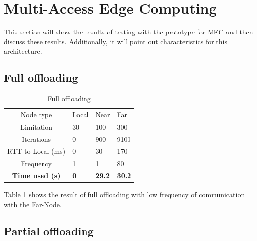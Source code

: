 

\section{Multi-Access Edge Computing} \label{section:MEC_evaluation}
This section will show the results of testing with the prototype for MEC and then discuss these results. Additionally, it will point out characteristics for this architecture.




\subsection{Full offloading}

\begin{table}[h!]
    \centering
    \begin{tabular}[c]{c|p{2cm}p{2cm}p{2cm}}

        Node type & Local & Near & Far \\

        Limitation          & 30 & 100 & 300  \\

        Iterations          & 0 & 900 & 9100  \\

        RTT to Local (ms)   & 0 & 30 & 170 \\

        Frequency           & 1 & 1 & 80 \\

        \hline
        \textbf{Time used (s)}       & \textbf{0} & \textbf{29.2} & \textbf{30.2} \\

    \end{tabular}
    \caption{Full offloading}
    \label{tab:MEC_full_offloading_low_frequency}
\end{table}

Table \ref{tab:MEC_full_offloading_low_frequency} shows the result of full offloading with low frequency of communication with the Far-Node.






\subsection{Partial offloading}



